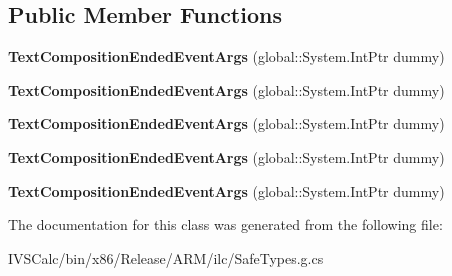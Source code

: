 \subsection*{Public Member Functions}
\begin{DoxyCompactItemize}
\item 
\mbox{\label{class_windows_1_1_u_i_1_1_xaml_1_1_controls_1_1_text_composition_ended_event_args_ada8cdcf0954b3f26f18ef8a5d77e2e72}} 
{\bfseries Text\+Composition\+Ended\+Event\+Args} (global\+::\+System.\+Int\+Ptr dummy)
\item 
\mbox{\label{class_windows_1_1_u_i_1_1_xaml_1_1_controls_1_1_text_composition_ended_event_args_ada8cdcf0954b3f26f18ef8a5d77e2e72}} 
{\bfseries Text\+Composition\+Ended\+Event\+Args} (global\+::\+System.\+Int\+Ptr dummy)
\item 
\mbox{\label{class_windows_1_1_u_i_1_1_xaml_1_1_controls_1_1_text_composition_ended_event_args_ada8cdcf0954b3f26f18ef8a5d77e2e72}} 
{\bfseries Text\+Composition\+Ended\+Event\+Args} (global\+::\+System.\+Int\+Ptr dummy)
\item 
\mbox{\label{class_windows_1_1_u_i_1_1_xaml_1_1_controls_1_1_text_composition_ended_event_args_ada8cdcf0954b3f26f18ef8a5d77e2e72}} 
{\bfseries Text\+Composition\+Ended\+Event\+Args} (global\+::\+System.\+Int\+Ptr dummy)
\item 
\mbox{\label{class_windows_1_1_u_i_1_1_xaml_1_1_controls_1_1_text_composition_ended_event_args_ada8cdcf0954b3f26f18ef8a5d77e2e72}} 
{\bfseries Text\+Composition\+Ended\+Event\+Args} (global\+::\+System.\+Int\+Ptr dummy)
\end{DoxyCompactItemize}


The documentation for this class was generated from the following file\+:\begin{DoxyCompactItemize}
\item 
I\+V\+S\+Calc/bin/x86/\+Release/\+A\+R\+M/ilc/Safe\+Types.\+g.\+cs\end{DoxyCompactItemize}
